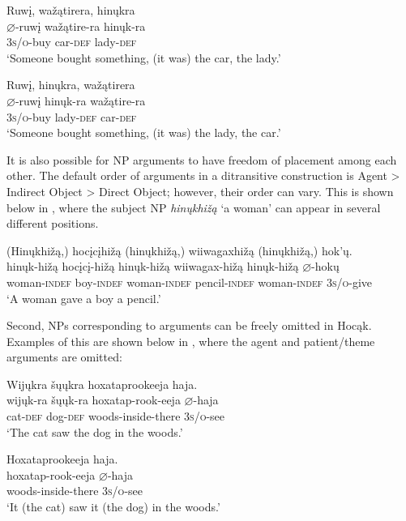 \documentclass[output=paper]{LSP/langsci}
\begin{document}
\ex
\glll Ruw\k{i}, 		wa\v{z}ątirera,	hin\k{u}kra\\
$\varnothing$-ruw\k{i}	wa\v{z}ątire-ra	hin\k{u}k-ra \\
\textsc{3s/o}-buy car-\textsc{def} lady-\textsc{def} \\
\trans `Someone bought something, (it was) the car, the lady.' 

\ex
\glll Ruw\k{i}, 		hin\k{u}kra, 	wa\v{z}ątirera \\
$\varnothing$-ruw\k{i} 	hin\k{u}k-ra 	wa\v{z}ątire-ra \\ 
\textsc{3s/o}-buy lady-\textsc{def} car-\textsc{def} \\
\trans `Someone bought something, (it was) the lady, the car.'
\z

It is also possible for NP arguments to have freedom of placement among each other. The default order of arguments in a ditransitive construction is Agent > Indirect Object > Direct Object; however, their order can vary.  This is shown below in , where the subject NP \textit{hin\k{u}khi\v{z}ą} `a woman' can appear in several different positions.

\ea\label{ex:jrs:13}
\glll (Hin\k{u}khi\v{z}ą,) 	hoc\k{i}c\k{i}hi\v{z}ą 	(hin\k{u}khi\v{z}ą,) wiiwagaxhi\v{z}ą 	(hin\k{u}khi\v{z}ą,) hok'\k{u}.\\
hin\k{u}k-hi\v{z}ą 		hoc\k{i}c\k{i}-hi\v{z}ą 	hin\k{u}k-hi\v{z}ą 		wiiwagax-hi\v{z}ą 	hin\k{u}k-hi\v{z}ą 	$\varnothing$-hok\k{u}\\
	woman-\textsc{indef}	boy-\textsc{indef} 	woman-\textsc{indef} 	pencil-\textsc{indef} 	woman-\textsc{indef} 	\textsc{3s/o}-give\\
\trans `A woman gave a boy a pencil.'
\z
	
Second, NPs corresponding to arguments can be freely omitted in Hocąk. Examples of this are shown below in , where the agent and patient/theme arguments are omitted:

\begin{exe}
\ex\label{ex:jrs:14}
\begin{xlist} 
\glll Wij\k{u}kra	\v{s}\k{u}\k{u}kra		hoxataprookeeja 		haja.\\
wij\k{u}k-ra	\v{s}\k{u}\k{u}k-ra	hoxatap-rook-eeja 	$\varnothing$-haja \\
	cat-\textsc{def} 	dog-\textsc{def} 	woods-inside-there 	\textsc{3s/o}-see \\
\trans `The cat saw the dog in the woods.'

\ex 
\glll Hoxataprookeeja haja. \\
hoxatap-rook-eeja 	$\varnothing$-haja \\
woods-inside-there \textsc{3s/o}-see \\
\trans `It (the cat) saw it (the dog) in the woods.'
\end{xlist}
\end{exe}
\end{document}
